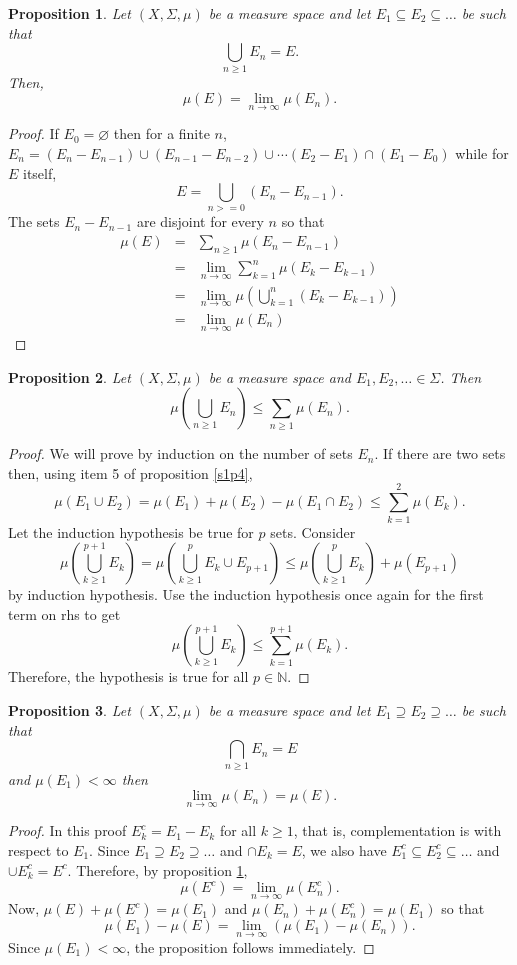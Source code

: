 \documentclass{article}
\theoremstyle{plain}
\numberwithin{thm}{section}
\theoremstyle{plain}
\newtheorem{prop}{Proposition}
\numberwithin{prop}{section}
\theoremstyle{definition}
\numberwithin{defn}{section}
\theoremstyle{remark}
\theoremstyle{plain}
\numberwithin{cor}{section}
\numberwithin{equation}{section}
\begin{document}
\begin{prop}\label{s1p5}Let $(X, \Sigma, \mu)$ be a measure space and let
$E_1 \subseteq E_2 \subseteq \ldots$ be such that
\[
\bigcup_{n \ge 1}E_n = E.
\]
Then,
\[
\mu(E) = \lim_{n \rightarrow \infty}\mu(E_n).
\]
\end{prop}
\begin{proof}
If $E_0 = \varnothing$ then for a finite $n$, $E_n = (E_n - E_{n-1}) \cup 
(E_{n-1} - E_{n-2}) \cup \cdots (E_2 - E_1) \cap (E_1 - E_0)$ while for $E$ 
itself,
\[
E = \bigcup_{n >= 0} (E_{n} - E_{n-1}).
\]
The sets $E_{n} - E_{n-1}$ are disjoint for every $n$ so that
\begin{eqnarray*}
\mu(E) &=& \sum_{n \ge 1} \mu(E_n - E_{n-1}) \\
  &=& \lim_{n \rightarrow \infty}\sum_{k=1}^n \mu(E_k - E_{k-1}) \\
  &=& \lim_{n \rightarrow \infty}\mu\left(\bigcup_{k=1}^n (E_k - E_{k-1})\right) \\
  &=& \lim_{n \rightarrow \infty}\mu(E_n)
\end{eqnarray*}
\end{proof}

\begin{prop}\label{s1p6}Let $(X, \Sigma, \mu)$ be a measure space and
$E_1, E_2, \ldots \in \Sigma$. Then
\[
\mu\left(\bigcup_{n \ge 1}E_n\right) \le \sum_{n \ge 1}\mu(E_n).
\]
\end{prop}
\begin{proof}
We will prove by induction on the number of sets $E_n$. If there are two sets
then, using item 5 of proposition \ref{s1p4},
\[
\mu(E_1 \cup E_2) = \mu(E_1) + \mu(E_2) - \mu(E_1 \cap E_2) \le \sum_{k=1}^2\mu(E_k).
\]
Let the induction hypothesis be true for $p$ sets. Consider
\[
\mu\left(\bigcup_{k \ge 1}^{p+1}E_k\right) = 
\mu\left(\bigcup_{k \ge 1}^{p}E_k \cup E_{p+1}\right) \le 
\mu\left(\bigcup_{k \ge 1}^{p}E_k\right) + \mu(E_{p+1})
\]
by induction hypothesis. Use the induction hypothesis once again for the first
term on rhs to get
\[
\mu\left(\bigcup_{k \ge 1}^{p+1}E_k\right) \le \sum_{k=1}^{p+1}\mu(E_k).
\]
Therefore, the hypothesis is true for all $p \in \mathbb{N}$.
\end{proof}

\begin{prop}\label{s1p7}Let $(X, \Sigma, \mu)$ be a measure space and let
$E_1 \supseteq E_2 \supseteq \ldots$ be such that 
\[
\bigcap_{n \ge 1}E_n = E
\]
and $\mu(E_1) < \infty$ then
\[
\lim_{n \rightarrow \infty}\mu(E_n) = \mu(E).
\]
\end{prop}
\begin{proof}
In this proof $E_k^c = E_1 - E_k$ for all $k \ge 1$, that is, complementation is
with respect to $E_1$. Since $E_1 \supseteq E_2 \supseteq \ldots$ and $\cap E_k 
= E$, we also have $E_1^c \subseteq E_2^c \subseteq \ldots$ and $\cup E_k^c = E^c$.
Therefore, by proposition \ref{s1p5},
\[
\mu(E^c) = \lim_{n \rightarrow \infty}\mu(E_n^c).
\]
Now, $\mu(E) + \mu(E^c) = \mu(E_1)$ and $\mu(E_n) + \mu(E_n^c) = \mu(E_1)$ so that
\[
\mu(E_1) - \mu(E) = \lim_{n \rightarrow \infty}(\mu(E_1) - \mu(E_n)).
\]
Since $\mu(E_1) < \infty$, the proposition follows immediately.
\end{proof}
\end{document}
